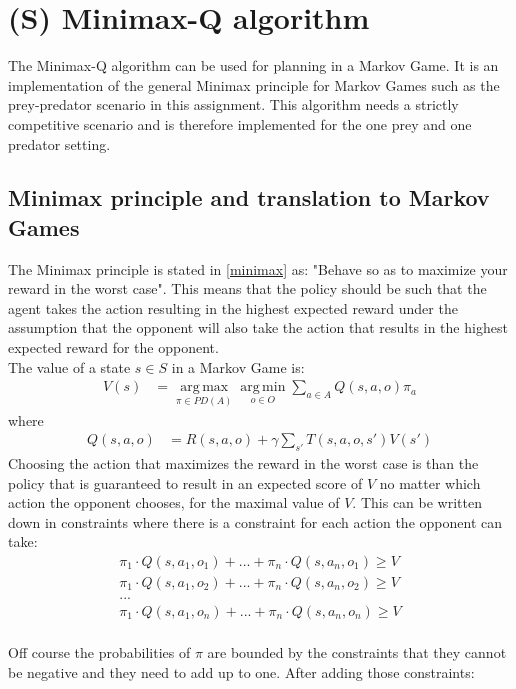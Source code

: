 
\section{(S) Minimax-Q algorithm}
The Minimax-Q algorithm can be used for planning in a Markov Game. It is an implementation of the general Minimax principle for Markov Games such as the prey-predator scenario in this assignment. This algorithm needs a strictly competitive scenario and is therefore implemented for the one prey and one predator setting. 

\subsection{Minimax principle and translation to Markov Games}
The Minimax principle is stated in \ref{minimax} as: "Behave so as to maximize your reward in the worst case". This means that the policy should be such that the agent takes the action resulting in the highest expected reward under the assumption that the opponent will also take the action that results in the highest expected reward for the opponent.  \\
 
The value of a state $s\in S$ in a Markov Game is:
\begin{align*}
V(s) &= \operatorname*{arg\,max}_{\pi \in PD(A)}
\operatorname*{arg\,min}_{o \in O}
\sum_{a \in A} Q(s,a,o) \pi_a
\end{align*}
where
\begin{align*}
Q(s,a,o) &= R(s,a,o) + \gamma \sum_{s'} T(s,a,o,s')V(s')
\end{align*}
Choosing the action that maximizes the reward in the worst case is than the policy that is guaranteed to result in an expected score of $V$ no matter which action the opponent chooses, for the maximal value of $V$. This can be written down in constraints where there is a constraint for each action the opponent can take:
%  
\begin{align*}
\pi_1 \cdot Q(s,a_1,o_1)+ ... + \pi_n \cdot Q(s,a_n,o_1) \geq V\\
\pi_1 \cdot Q(s,a_1,o_2)+ ... + \pi_n \cdot Q(s,a_n,o_2) \geq V\\
...\\
\pi_1 \cdot Q(s,a_1,o_n)+ ... + \pi_n \cdot Q(s,a_n,o_n) \geq V\\
\end{align*}

Off course the probabilities of $\pi$ are bounded by the constraints that they cannot be negative and they need to add up to one. After adding those constraints:

